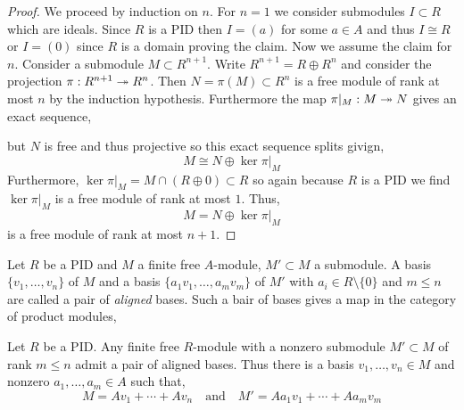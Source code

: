 \documentclass[12pt]{article}
\begin{document}
\begin{proof}
We proceed by induction on $n$. For $n = 1$ we consider submodules $I \subset R$ which are ideals. Since $R$ is a PID then $I = (a)$ for some $a \in A$ and thus $I \cong R$ or $I = (0)$ since $R$ is a domain proving the claim. Now we assume the claim for $n$. Consider a submodule $M \subset R^{n+1}$. Write $R^{n+1} = R \oplus R^n$ and consider the projection $\pi : R^{n+1} \twoheadrightarrow R^n$. Then $N = \pi(M) \subset R^n$ is a free module of rank at most $n$ by the induction hypothesis. Furthermore the map $\pi|_M : M \twoheadrightarrow N$ gives an exact sequence,
\begin{center}
\end{center} 
but $N$ is free and thus projective so this exact sequence splits givign,
\[ M \cong N \oplus \ker{\pi|_M} \]
Furthermore, $\ker{\pi|_M} = M \cap (R \oplus 0) \subset R$ so again because $R$ is a PID we find $\ker{\pi|_M}$ is a free module of rank at most $1$. Thus, 
\[ M = N \oplus \ker{\pi|_M} \]
is a free module of rank at most $n + 1$.
\end{proof}

\begin{defn}
Let $R$ be a PID and $M$ a finite free $A$-module, $M' \subset M$ a submodule. A basis $\{ v_1, \dots, v_n \}$ of $M$ and a basis $\{ a_1 v_1, \dots, a_m v_m \}$ of $M'$ with $a_i \in R \setminus \{ 0 \}$ and $m \le n$ are called a pair of \textit{aligned} bases. Such a bair of bases gives a map in the category of product modules,
\begin{center}
\end{center}
\end{defn}

\begin{lemma}
Let $R$ be a PID. Any finite free $R$-module with a nonzero submodule $M' \subset M$ of rank $m \le n$ admit a pair of aligned bases. Thus there is a basis $v_1, \dots, v_n \in M$ and nonzero $a_1, \dots, a_m \in A$ such that,
\[ M = A v_1 + \cdots + A v_n \quad \text{and} \quad M' = A a_1 v_1 + \cdots + A a_m v_m \]
\end{lemma}
\end{document}
